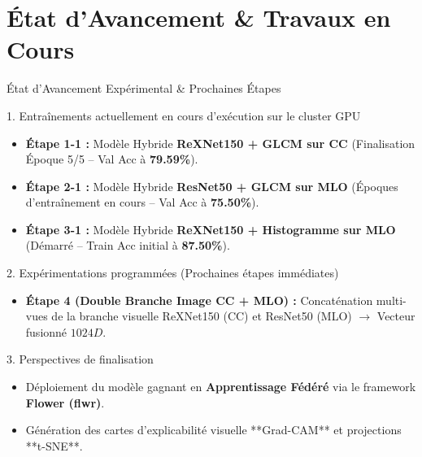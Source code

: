 \documentclass[10pt, compress]{beamer}
\begin{document}
\section{État d'Avancement \& Travaux en Cours}

\begin{frame}{État d'Avancement Expérimental \& Prochaines Étapes}
    \begin{block}{1. Entraînements actuellement en cours d'exécution sur le cluster GPU}
        \begin{itemize}
            \item \textbf{Étape 1-1 :} Modèle Hybride \textbf{ReXNet150 + GLCM sur CC} (Finalisation Époque 5/5 -- Val Acc à \textbf{79.59\%}).
            \item \textbf{Étape 2-1 :} Modèle Hybride \textbf{ResNet50 + GLCM sur MLO} (Époques d'entraînement en cours -- Val Acc à \textbf{75.50\%}).
            \item \textbf{Étape 3-1 :} Modèle Hybride \textbf{ReXNet150 + Histogramme sur MLO} (Démarré -- Train Acc initial à \textbf{87.50\%}).
        \end{itemize}
    \end{block}

    \begin{block}{2. Expérimentations programmées (Prochaines étapes immédiates)}
        \begin{itemize}
            \item \textbf{Étape 4 (Double Branche Image CC + MLO) :} Concaténation multi-vues de la branche visuelle ReXNet150 (CC) et ResNet50 (MLO) $\rightarrow$ Vecteur fusionné $1024D$.
        \end{itemize}
    \end{block}

    \begin{block}{3. Perspectives de finalisation}
        \begin{itemize}
            \item Déploiement du modèle gagnant en \textbf{Apprentissage Fédéré} via le framework \textbf{Flower (flwr)}.
            \item Génération des cartes d'explicabilité visuelle **Grad-CAM** et projections **t-SNE**.
        \end{itemize}
    \end{block}
\end{frame}
\end{document}

